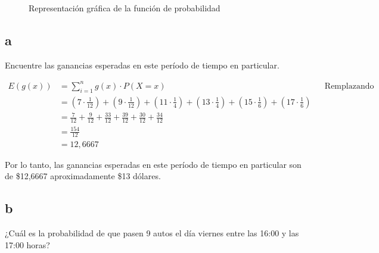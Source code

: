 \documentclass{templateNote}
\begin{document}
\begin{figure}[H]
    \begin{center}
        \caption{Representación gráfica de la función de probabilidad}
    \end{center}
\end{figure}

\newpage
\subsection{a}
Encuentre las ganancias esperadas en este período de tiempo en particular.

\begin{align*}
    E(g(x)) &= \displaystyle \sum_{i=1}^{n}{g(x) \cdot P(X=x)} && \text{Remplazando} \\
    &= (7 \cdot \frac{1}{12}) + (9 \cdot \frac{1}{12}) + (11 \cdot \frac{1}{4}) + (13 \cdot \frac{1}{4}) + (15 \cdot \frac{1}{6}) + (17 \cdot \frac{1}{6}) \\
    &= \frac{7}{12} + \frac{9}{12} + \frac{33}{12} + \frac{39}{12} + \frac{30}{12} + \frac{34}{12} \\
    &= \frac{154}{12} \\
    &= 12,6667
\end{align*}

Por lo tanto, las ganancias esperadas en este período de tiempo en particular son de \$12,6667 aproximadamente \$13 dólares.  

\subsection{b}
¿Cuál es la probabilidad de que pasen 9 autos el día viernes entre las 16:00 y las 17:00 horas?
\end{document}
